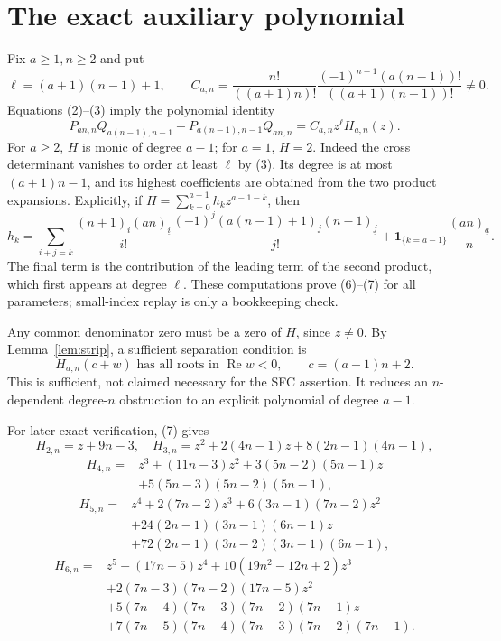 \documentclass[11pt]{article}
\begin{document}
\section{The exact auxiliary polynomial}
Fix $a\ge1,n\ge2$ and put
\[
 \ell=(a+1)(n-1)+1,\qquad
 C_{a,n}=\frac{n!}{((a+1)n)!}
         \frac{(-1)^{n-1}(a(n-1))!}{((a+1)(n-1))!}\ne0.
\]
Equations (2)--(3) imply the polynomial identity
\[
 P_{an,n}Q_{a(n-1),n-1}-P_{a(n-1),n-1}Q_{an,n}
       =C_{a,n}z^\ell H_{a,n}(z).                    \tag{6}
\]
For $a\ge2$, $H$ is monic of degree $a-1$; for $a=1$, $H=2$.
Indeed the cross determinant vanishes to order at least $\ell$ by (3).
Its degree is at most $(a+1)n-1$, and its highest coefficients are obtained
from the two product expansions. Explicitly, if
$H=\sum_{k=0}^{a-1}h_kz^{a-1-k}$, then
\[
 h_k=\sum_{i+j=k}
 \frac{(n+1)_i(an)_{\underline i}}{i!}
 \frac{(-1)^j(a(n-1)+1)_j(n-1)_{\underline j}}{j!}
 +\mathbf1_{\{k=a-1\}}\frac{(an)_{\underline a}}n.     \tag{7}
\]
The final term is the contribution of the leading term of the second
product, which first appears at degree $\ell$. These computations prove
(6)--(7) for all parameters; small-index replay is only a bookkeeping check.

Any common denominator zero must be a zero of $H$, since $z\ne0$.
By Lemma~\ref{lem:strip}, a sufficient separation condition is
\[
 H_{a,n}(c+w)\text{ has all roots in }\operatorname{Re}w<0,
                    \qquad c=(a-1)n+2.               \tag{8}
\]
This is sufficient, not claimed necessary for the SFC assertion.
It reduces an $n$-dependent degree-$n$ obstruction to an explicit
polynomial of degree $a-1$.

For later exact verification, (7) gives
\[
 H_{2,n}=z+9n-3,
\quad H_{3,n}=z^2+2(4n-1)z+8(2n-1)(4n-1),
\]
\[
 \begin{split}
 H_{4,n}={}&z^3+(11n-3)z^2+3(5n-2)(5n-1)z\\
          &+5(5n-3)(5n-2)(5n-1),
 \end{split}
\]
\[
 \begin{split}
 H_{5,n}={}&z^4+2(7n-2)z^3+6(3n-1)(7n-2)z^2\\
 &+24(2n-1)(3n-1)(6n-1)z\\
 &+72(2n-1)(3n-2)(3n-1)(6n-1),
 \end{split}
\]
\[
 \begin{split}
 H_{6,n}={}&z^5+(17n-5)z^4+10(19n^2-12n+2)z^3\\
 &+2(7n-3)(7n-2)(17n-5)z^2\\
 &+5(7n-4)(7n-3)(7n-2)(7n-1)z\\
 &+7(7n-5)(7n-4)(7n-3)(7n-2)(7n-1).
 \end{split}
\]
\end{document}
